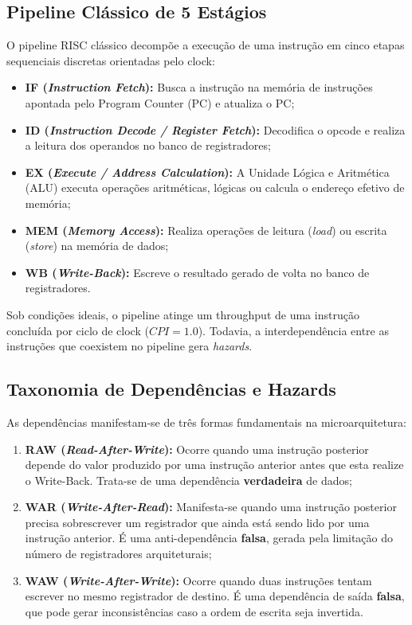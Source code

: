 \documentclass[12pt,a4paper]{article}
\begin{document}
\subsection{Pipeline Clássico de 5 Estágios}
O pipeline RISC clássico decompõe a execução de uma instrução em cinco etapas sequenciais discretas orientadas pelo clock:
\begin{itemize}
    \item \textbf{IF (\textit{Instruction Fetch}):} Busca a instrução na memória de instruções apontada pelo Program Counter (PC) e atualiza o PC;
    \item \textbf{ID (\textit{Instruction Decode / Register Fetch}):} Decodifica o opcode e realiza a leitura dos operandos no banco de registradores;
    \item \textbf{EX (\textit{Execute / Address Calculation}):} A Unidade Lógica e Aritmética (ALU) executa operações aritméticas, lógicas ou calcula o endereço efetivo de memória;
    \item \textbf{MEM (\textit{Memory Access}):} Realiza operações de leitura (\textit{load}) ou escrita (\textit{store}) na memória de dados;
    \item \textbf{WB (\textit{Write-Back}):} Escreve o resultado gerado de volta no banco de registradores.
\end{itemize}
Sob condições ideais, o pipeline atinge um throughput de uma instrução concluída por ciclo de clock ($CPI = 1.0$). Todavia, a interdependência entre as instruções que coexistem no pipeline gera \textit{hazards}.

\subsection{Taxonomia de Dependências e Hazards}
As dependências manifestam-se de três formas fundamentais na microarquitetura:
\begin{enumerate}
    \item \textbf{RAW (\textit{Read-After-Write}):} Ocorre quando uma instrução posterior depende do valor produzido por uma instrução anterior antes que esta realize o Write-Back. Trata-se de uma dependência \textbf{verdadeira} de dados;
    \item \textbf{WAR (\textit{Write-After-Read}):} Manifesta-se quando uma instrução posterior precisa sobrescrever um registrador que ainda está sendo lido por uma instrução anterior. É uma anti-dependência \textbf{falsa}, gerada pela limitação do número de registradores arquiteturais;
    \item \textbf{WAW (\textit{Write-After-Write}):} Ocorre quando duas instruções tentam escrever no mesmo registrador de destino. É uma dependência de saída \textbf{falsa}, que pode gerar inconsistências caso a ordem de escrita seja invertida.
\end{enumerate}
\end{document}
